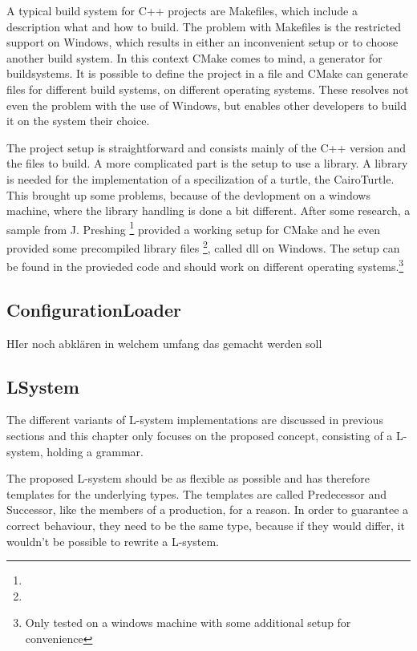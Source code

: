 \documentclass[english]{cpp-hmwk}
\begin{document}
A typical build system for C++ projects are Makefiles, which include a description what and how to build. The problem with Makefiles is the restricted support on Windows, which results in either an inconvenient setup or to choose another build system.
In this context CMake comes to mind, a generator for buildsystems. It is possible to define the project in a file and CMake can generate files for different build systems, on different operating systems. These resolves not even the problem with the use of Windows, but enables other developers to build it on the system their choice.

The project setup is straightforward and consists mainly of the C++ version and the files to build. A more complicated part is the setup to use a library. A library is needed for the implementation of a specilization of a turtle, the CairoTurtle. This brought up some problems, because of the devlopment on a windows machine, where the library handling is done a bit different. After some research, a sample from J. Preshing \footnote{} provided a working setup for CMake and he even provided some precompiled library files \footnote{}, called dll on Windows. 
The setup can be found in the provieded code and should work on different operating systems.\footnote{Only tested on a windows machine with some additional setup for convenience}

\subsection{ConfigurationLoader}

HIer noch abklären in welchem umfang das gemacht werden soll


\pagebreak


\subsection{LSystem}
The different variants of L-system implementations are discussed in previous sections and this chapter only focuses on the proposed concept, consisting of a L-system, holding a grammar.

The proposed L-system should be as flexible as possible and has therefore templates for the underlying types. The templates are called Predecessor and Successor, like the members of a production, for a reason. In order to guarantee a correct behaviour, they need to be the same type, because if they would differ, it wouldn't be possible to rewrite a L-system.
\end{document}
